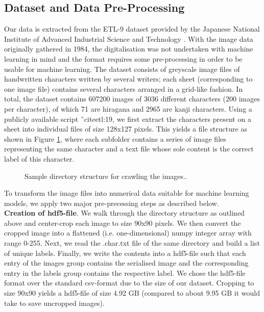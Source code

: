 \documentclass[british,12p]{article}
\begin{document}
    \subsection{Dataset and Data Pre-Processing}\label{secPreProcess}
    Our data is extracted from the ETL-9 dataset provided by the Japanese National Institute of Advanced Industrial Science and Technology \cite{aist:14}. With the image data originally gathered in 1984, the digitalisation was not undertaken with machine learning in mind and the format requires some pre-processing in order to be usable for machine learning. The dataset consists of greyscale image files of handwritten characters written by several writers; each sheet (corresponding to one image file) contains several characters arranged in a grid-like fashion. In total, the dataset contains 607200 images of 3036 different characters (200 images per character), of which 71 are hiragana and 2965 are kanji characters.
    	Using a publicly available script ˜cite{etl:19}, we first extract the characters present on a sheet into individual files of size 128x127 pixels. This yields a file structure as shown in Figure \ref{fig-directory-structure}, where each subfolder contains a series of image files representing the same character and a text file whose sole content is the correct label of this character.
    	
    	\begin{figure}[hbt]
			\begin{center}
  				\caption{Sample directory structure for crawling the images..}
  				\label{fig-directory-structure}
  			\end{center}
		\end{figure}
    	
    	To transform the image files into numerical data suitable for machine learning models, we apply two major pre-precessing steps as described below.\\
    	
    	
    	\textbf{Creation of hdf5-file}. We walk through the directory structure as outlined above and center-crop each image to size 90x90 pixels. We then convert the cropped image into a flattened (i.e. one-dimensional) numpy integer array with range 0-255. Next, we read the .char.txt file of the same directory and build a list of unique labels. Finally, we write the contents into a hdf5-file such that each entry of the images group contains the serialised image and the corresponding entry in the labels group contains the respective label. We chose the hdf5-file format over the standard csv-format due to the size of our dataset. Cropping to size 90x90 yields a hdf5-file of size 4.92 GB (compared to about 9.95 GB it would take to save uncropped images).\\
    	
\end{document}
